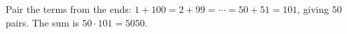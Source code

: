 Pair the terms from the ends: $1+100=2+99=\cdots=50+51=101$, giving $50$ pairs. The sum is $50\cdot101=\boxed{5050}$.
